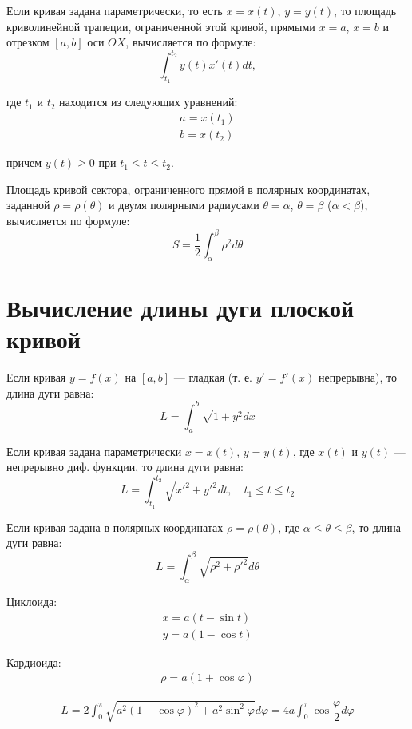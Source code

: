 \documentclass[a4paper,12pt,oneside]{extbook}
\theoremstyle{numbered}
\theoremstyle{unnumbered}
\theoremstyle{named}
\theoremstyle{unnumbered}
\theoremstyle{named}
\theoremstyle{named}
\theoremstyle{named}
\begin{document}
Если кривая задана параметрически, то есть \(x = x(t)\), \(y = y(t)\), то площадь криволинейной трапеции, ограниченной этой кривой, прямыми \(x = a\), \(x = b\) и отрезком \([a, b]\) оси \(OX\), вычисляется по формуле:
\[
    \int_{t_1}^{t_2} y(t) x'(t) dt,
\]

где \(t_1\) и \(t_2\) находится из следующих уравнений:
\begin{gather*}
    a = x(t_1) \\
    b = x(t_2)
\end{gather*}

причем \(y(t) \geq 0\) при \(t_1 \leq t \leq t_2\).

Площадь кривой сектора, ограниченного прямой в полярных координатах, заданной \(\rho = \rho(\theta)\) и двумя полярными радиусами \(\theta = \alpha\), \(\theta = \beta\) (\(\alpha < \beta\)), вычисляется по формуле:
\[
    S = \frac{1}{2} \int_{\alpha}^{\beta} \rho^2 d\theta
\]

\section{Вычисление длины дуги плоской кривой}%
\label{sec:Вычисление длины дуги плоской кривой}

Если кривая \(y = f(x)\) на \([a, b]\) — гладкая (т. е. \(y' = f'(x)\) непрерывна), то длина дуги равна:
\[
    L = \int_a^b \sqrt{1 + y^2} dx
\]

Если кривая задана параметрически \(x = x(t)\), \(y = y(t)\), где \(x(t)\) и \(y(t)\) — непрерывно диф. функции, то длина дуги равна:
\[
    L = \int_{t_1}^{t_2} \sqrt{x'^2 + y'^2}dt, \quad t_1 \leq t \leq t_2
\]

Если кривая задана в полярных координатах \(\rho = \rho(\theta)\), где \(\alpha \leq \theta \leq \beta\), то длина дуги равна:
\[
    L = \int_{\alpha}^{\beta} \sqrt{\rho^2 + \rho'^2} d\theta
\]

Циклоида:
\begin{gather*}
    x = a(t - \sin{t}) \\
    y = a(1 - \cos{t})
\end{gather*}


Кардиоида:
\begin{gather*}
    \rho = a(1 + \cos{\varphi})
\end{gather*}

\begin{gather*}
    L = 2 \int_0^\pi \sqrt{a^2(1 + \cos{\varphi})^2 + a^2\sin^2{\varphi}} d\varphi = 4a \int_0^\pi \cos{\dfrac{\varphi}{2}} d\varphi
\end{gather*}
\end{document}
